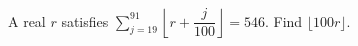 A real $ r $ satisfies $\sum_{j=19}^{91}\left\lfloor r+\dfrac{j}{100}\right\rfloor=546 $. Find $\lfloor100r\rfloor $.
